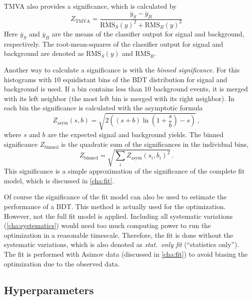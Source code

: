 TMVA also provides a significance, which is calculated by
\begin{equation}
    Z_\text{TMVA} = \frac{\overline{y}_S - \overline{y}_B}{{\text{RMS}_S(y)}^2 + {\text{RMS}_B(y)}^2}
\end{equation}
Here $\overline{y}_{S}$ and $\overline{y}_{B}$ are the means of the classifier output for signal and background, respectively.
The root-mean-squares of the classifier output for signal and background are denoted as $\text{RMS}_S(y)$ and $\text{RMS}_B$.

Another way to calculate a significance is with the \emph{binned significance}.
For this histograms with $10$ equidistant bins of the BDT distribution for signal and background is used.
If a bin contains less than $10$ background events, it is merged with its left neighbor (the most left bin is merged
with its right neighbor).
In each bin the significance is calculated with the asymptotic formula~\cite{CowanAsymSig}
\begin{equation}
    Z_\text{asym}(s, b) = \sqrt{2 \left( (s+b) \ln \left(1 + \frac{s}{b} \right) - s \right)} \,,
\end{equation}
where $s$ and $b$ are the expected signal and background yields.
The binned significance $Z_\text{binned}$ is the quadratic sum of the significances in the individual bins,
\begin{equation}
    Z_\text{binned} = \sqrt{\sum_i {Z_\text{asym}(s_i, b_i)}^2} \,.
\end{equation}
This significance is a simple approximation of the significance of the complete fit model, which is discussed in \cref{cha:fit}.

Of course the significance of the fit model can also be used to estimate the performance of a BDT\@.
This method is actually used for the optimization.
However, not the full fit model is applied.
Including all systematic variations (\cref{cha:systematics}) would need too much computing power to run the optimization in a reasonable timescale.
Therefore, the fit is done without the systematic variations, which is also denoted as \emph{stat.\ only fit} (``statistics only'').
The fit is performed with Asimov data (discussed in \cref{cha:fit}) to avoid biasing the optimization due to the observed data.

\subsection{Hyperparameters}\label{sub:mva:hyperparameters}

